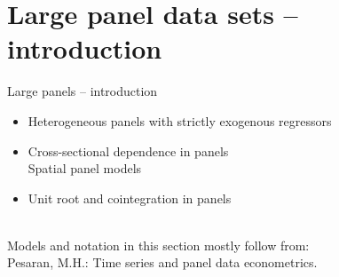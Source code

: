 \documentclass[usenames,dvipsnames]{beamer}
\begin{document}
\section{Large panel data sets -- introduction}
\begin{frame}{Large panels -- introduction}
    \begin{itemize}
        \item Heterogeneous panels with strictly exogenous regressors
        \bigskip
        \item Cross-sectional dependence in panels \\ \smallskip Spatial panel models
        \bigskip
        \item Unit root and cointegration in panels\\ \bigskip ~\\ \bigskip
    \end{itemize}
    
    \footnotesize
    Models and notation in this section mostly follow from:\\ Pesaran, M.H.: Time series and panel data econometrics.
\end{frame}
\end{document}
